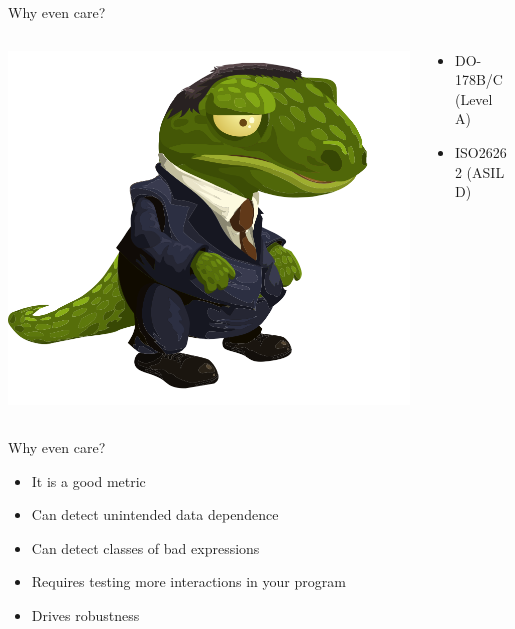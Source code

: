 \documentclass[xcolor = {dvipsnames, table}, aspectratio=169]{beamer}
\begin{document}
\begin{frame}
    Why even care?
    \begin{columns}
        \begin{column}{0.5\textwidth}
            \includegraphics[width = \textwidth]{img/bureaucrat.png}
        \end{column}

        \begin{column}{0.5\textwidth}
            \begin{itemize}
                \item DO-178B/C (Level A)
                \item ISO26262 (ASIL D)
            \end{itemize}
        \end{column}
    \end{columns}
\end{frame}

\begin{frame}
    Why even care?
    \begin{itemize}
        \item It is a good metric
        \item Can detect unintended data dependence
        \item Can detect classes of bad expressions
        \item Requires testing more interactions in your program
        \item Drives robustness
    \end{itemize}
\end{frame}
\end{document}
